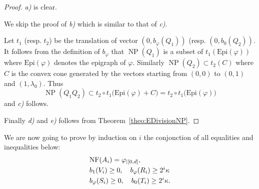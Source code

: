 \documentclass{sig-alternate-05-2015}
\DeclareMathOperator{\NP}{NP}
\newcommand{\NF}{\text{\rm NF}}
\newcommand{\Epi}{\textrm{Epi}}
\begin{document}
\begin{proof}
\emph{a)} is clear.

We skip the proof of \emph{b)} which is similar to that of \emph{c)}.

Let $t_1$ (resp. $t_2$) be the translation of vector $(0, b_\varphi
(Q_1))$ (resp. $(0, b_0(Q_2))$. It follows from the definition of
$b_\varphi$ that $\NP(Q_1)$ is a subset of $t_1(\Epi(\varphi))$ where
$\Epi(\varphi)$ denotes the epigraph of $\varphi$. Similarly $\NP(Q_2)
\subset t_2(C)$ where $C$ is the convex cone generated by the vectors 
starting from $(0,0)$ to $(0,1)$ and $(1, \lambda_0)$. Thus
$$\NP(Q_1 Q_2) \subset t_2 \circ t_1 \big(\Epi(\varphi) + C\big) =
t_2 \circ t_1\big(\Epi(\varphi)\big)$$
and \emph{c)} follows.

Finally \emph{d)} and \emph{e)} follows from
Theorem~\ref{theo:EDivisionNP}.
\end{proof}

We are now going to prove by induction on $i$ the conjonction of all
equalities and inequalities below:
\begin{equation}
\label{eq:induction}
\begin{array}{l}
\NF(A_i) = \varphi_{|[0,d]}, \smallskip \\
b_1(V_i) \geq 0, \quad
b_\varphi(R_i) \geq 2^i \kappa \smallskip \\
b_\varphi(S_i) \geq 0, \quad
b_0(T_i) \geq 2^i \kappa.
\end{array}
\end{equation}
\end{document}
